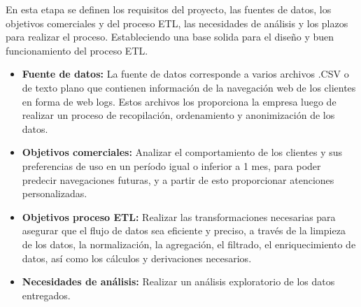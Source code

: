 En esta etapa se definen los requisitos del proyecto, las fuentes de datos, los objetivos comerciales y del proceso ETL, las necesidades de análisis y los plazos para realizar el proceso. Estableciendo una base solida para el diseño y buen funcionamiento del proceso ETL.
\begin{itemize}
    \item \textbf{Fuente de datos:} La fuente de datos corresponde a varios  archivos .CSV o de texto plano que contienen información de la navegación web de los clientes en forma de web logs. Estos archivos los proporciona la empresa luego de realizar un proceso de recopilación, ordenamiento y anonimización de los datos.
    \item \textbf{Objetivos comerciales:} Analizar el comportamiento de los clientes y sus preferencias de uso en un período igual o inferior a 1 mes, para poder predecir navegaciones futuras, y a partir de esto proporcionar atenciones personalizadas.
    \item \textbf{Objetivos proceso ETL:} Realizar las transformaciones necesarias para asegurar que el flujo de datos sea eficiente y preciso, a través de la limpieza de los datos, la normalización, la agregación, el filtrado, el enriquecimiento de datos, así como los cálculos y derivaciones necesarios.
    \item \textbf{Necesidades de análisis:} Realizar un análisis exploratorio de los datos entregados.
\end{itemize}
